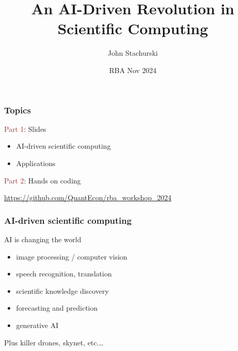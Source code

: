 \documentclass[
    xcolor={svgnames,dvipsnames},
    hyperref={colorlinks, citecolor=DeepPink4, linkcolor=DarkRed, urlcolor=DarkBlue}
    ]{beamer}  %
\title{An AI-Driven Revolution in Scientific Computing}
\author{John Stachurski}
\date{RBA Nov 2024}
\newcommand{\brown}[1]{\textcolor{Brown}{\sf #1}}
\newcommand{\1}{\mathbbm 1}
\begin{document}
\begin{frame}
  \titlepage
\end{frame}



\begin{frame}
    \frametitle{Topics}

    \brown{Part 1}: Slides

    \begin{itemize}
        \item AI-driven scientific computing
        \vspace{0.5em}
        \item Applications  
        \vspace{0.5em}
    \end{itemize}

    \vspace{0.5em}
    \vspace{0.5em}
    \brown{Part 2}: Hands on coding


    \vspace{0.5em}

    \begin{center}
        \url{https://github.com/QuantEcon/rba_workshop_2024}
    \end{center}


\end{frame}



\begin{frame}
    \frametitle{AI-driven scientific computing}

    AI is changing the world

    \begin{itemize}
        \item image processing / computer vision
        \vspace{0.5em}
        \item speech recognition, translation
        \vspace{0.5em}
        \item scientific knowledge discovery
        \vspace{0.5em}
        \item forecasting and prediction 
        \vspace{0.5em}
        \item generative AI
    \end{itemize}

    \pause

        \vspace{0.5em}
        \vspace{0.5em}
        \vspace{0.5em}
    Plus killer drones, skynet, etc.\ldots

    
\end{frame}
\end{document}
